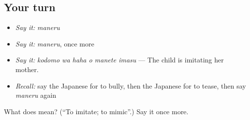 \subsection*{Your turn}
\begin{itemize}
\raggedright
  \item \emph{Say it:} \emph{maneru}
  \item \emph{Say it:} \emph{maneru}, once more
  \item \emph{Say it:} \emph{kodomo wa haha o manete imasu} — The child is imitating her mother.
  \item \emph{Recall:} say the Japanese for to bully, then the Japanese for to tease, then say \emph{maneru} again
\end{itemize}

\begin{tcolorbox}[breakable,colback=teal!4,colframe=teal!35!black,title={Before you move on}]
What does  mean? (\textquotedblleft{}To imitate; to mimic\textquotedblright{}.) Say it once more.
\end{tcolorbox}
